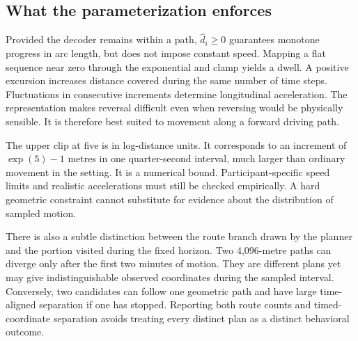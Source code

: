 \subsection{What the parameterization enforces}
Provided the decoder remains within a path, $\hat d_i\geq0$ guarantees monotone progress in arc length, but does not impose constant speed. Mapping a flat sequence near zero through the exponential and clamp yields a dwell. A positive excursion increases distance covered during the same number of time steps. Fluctuations in consecutive increments determine longitudinal acceleration. The representation makes reversal difficult even when reversing would be physically sensible. It is therefore best suited to movement along a forward driving path.

The upper clip at five is in log-distance units. It corresponds to an increment of $\exp(5)-1$ metres in one quarter-second interval, much larger than ordinary movement in the setting. It is a numerical bound. Participant-specific speed limits and realistic accelerations must still be checked empirically. A hard geometric constraint cannot substitute for evidence about the distribution of sampled motion.

There is also a subtle distinction between the route branch drawn by the planner and the portion visited during the fixed horizon. Two 4,096-metre paths can diverge only after the first two minutes of motion. They are different plans yet may give indistinguishable observed coordinates during the sampled interval. Conversely, two candidates can follow one geometric path and have large time-aligned separation if one has stopped. Reporting both route counts and timed-coordinate separation avoids treating every distinct plan as a distinct behavioral outcome.
